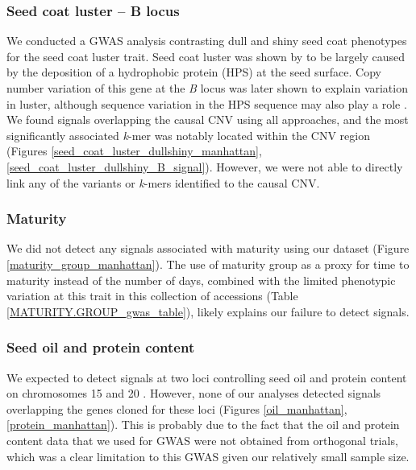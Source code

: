 \subsubsection{Seed coat luster -- B locus}
\label{sv-gwas-main-results-seed-coat-luster-b}

We conducted a GWAS analysis contrasting dull and shiny seed coat phenotypes
for the seed coat luster trait. Seed coat luster was shown by \cite{gijzen1999}
to be largely caused by the deposition of a hydrophobic protein (HPS)
at the seed surface. Copy number variation of this gene at the \textit{B}
locus was later shown to explain variation in luster, although sequence
variation in the HPS sequence may also play a role \citep{gijzen2006}.
We found signals overlapping the causal CNV using all approaches, and the
most significantly associated \textit{k}-mer was notably located
within the CNV region (Figures \ref{seed_coat_luster_dullshiny_manhattan},
\ref{seed_coat_luster_dullshiny_B_signal}). However, we were not able
to directly link any of the variants or \textit{k}-mers identified to the causal
CNV.

\subsubsection{Maturity}
\label{sv-gwas-main-results-maturity}

We did not detect any signals associated with maturity using our dataset
(Figure \ref{maturity_group_manhattan}). The use of maturity group as a proxy
for time to maturity instead of the number of days, combined with the limited
phenotypic variation at this trait in this collection of accessions (Table
\ref{MATURITY.GROUP_gwas_table}), likely explains our failure to detect
signals.

\subsubsection{Seed oil and protein content}
\label{sv-gwas-main-results-oil-protein}

We expected to detect signals at two loci controlling seed oil and protein
content on chromosomes 15 and 20 \citep{bandillo2015}. However, none of our
analyses detected signals overlapping the genes cloned for these loci (Figures
\ref{oil_manhattan}, \ref{protein_manhattan}). This is probably due to the fact
that the oil and protein content data that we used for GWAS were not obtained
from orthogonal trials, which was a clear limitation to this GWAS given our
relatively small sample size. 


